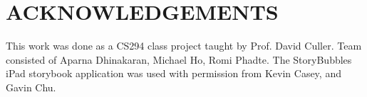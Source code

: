 \documentclass{sigchi}
\begin{document}

\section{ACKNOWLEDGEMENTS}
This work was done as a CS294 class project taught by Prof. David Culler. 
Team consisted of Aparna Dhinakaran, Michael Ho, Romi Phadte. 
The StoryBubbles iPad storybook application was used with permission from Kevin Casey, and Gavin Chu. 

\balance


\end{document}

